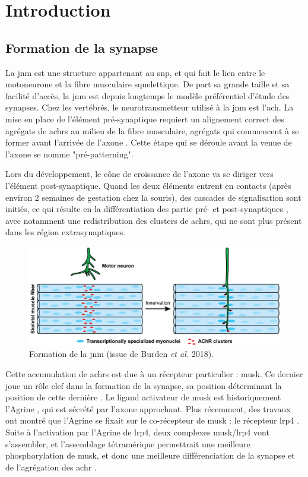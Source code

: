 \chapter{Introduction}

\section{Formation de la synapse}
	\label{sec:IntroSynapse}
	La \gls{jnm} est une structure appartenant au \gls{snp}, et qui fait le lien entre le motoneurone et la fibre musculaire squelettique. De part sa grande taille et sa facilité d'accès, la \gls{jnm} est depuis longtemps le modèle préférentiel d'étude des synapses. Chez les vertébrés, le neurotransmetteur utilisé à la \gls{jnm} est l'\gls{ach}. La mise en place de l'élément pré-synaptique requiert un alignement correct des agrégats de \glspl{achr} au milieu de la fibre musculaire, agrégats qui commencent à se former avant l'arrivée de l'axone \cite{Wu2010a, Gordon2012}. Cette étape qui se déroule avant la venue de l'axone se nomme "pré-patterning".
	
	Lors du développement, le cône de croissance de l'axone va se diriger vers l'élément post-synaptique. Quand les deux éléments entrent en contacts (après environ 2 semaines de gestation chez la souris), des cascades de signalisation sont initiés, ce qui résulte en la différentiation des partie pré- et post-synaptiques \cite{Sanes1999}, avec notamment une redistribution des clusters de \glspl{achr}, qui ne sont plus présent dans les région extrasynaptiques.
	
	\begin{figure}
		\includegraphics[width=\textwidth]{./Images/formation_jnm.png}
		\caption{Formation de la \gls{jnm} (issue de Burden \emph{et al.} 2018).}
		\label{fig:FormaJNM}
	\end{figure}
	\clearpage
	
	Cette accumulation de \glspl{achr} est due à un récepteur particulier : \gls{musk}. Ce dernier joue un rôle clef dans la formation de la synapse, sa position déterminant la position de cette dernière \cite{DeChiara1996, Glass1996}. Le ligand activateur de \gls{musk} est historiquement l'Agrine \cite{Glass1996}, qui est sécrété par l'axone approchant. Plus récemment, des travaux ont montré que l'Agrine se fixait sur le co-récepteur de \gls{musk} : le récepteur \gls{lrp4} \cite{Zhang2008, Kim2008}. Suite à l'activation par l'Agrine de \gls{lrp4}, deux complexes \gls{musk}/\gls{lrp4} vont s'assembler, et l'assemblage tétramérique permettrait une meilleure phosphorylation de \gls{musk}, et donc une meilleure différenciation de la synapse et de l'agrégation des \gls{achr} \cite{Zong2012}.
	
